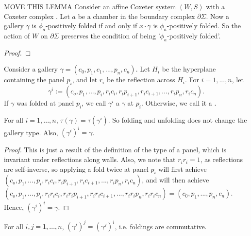 \documentclass[11pt]{article}
\begin{document}
\begin{lemma} MOVE THIS LEMMA
    Consider an affine Coxeter system $(W,S)$ with a Coxeter complex \sg. Let $a$ be a chamber in the boundary complex $\partial\Sigma$. Now a gallery $\gamma$ is $\phi_a$-positively folded if and only if $x\cdot \gamma$ is $\phi_a$-positively folded. So the action of $W$ on $\partial\Sigma$ preserves the condition of being '$\phi_a$-positively folded'.
\end{lemma}

\begin{proof}
    
\end{proof}

\begin{definition}
    Consider a gallery $\gamma = (c_0,p_1,c_1,...,p_n,c_n)$. Let $H_i$ be the hyperplane containing the panel $p_i$, and let $r_i$ be the reflection across $H_i$. For $i=1,...,n$, let
    \[\gamma^i:=(c_o,p_1,...,p_i,r_ic_i,r_ip_{i+1},r_ic_{i+1},...,r_ip_n,r_ic_n).\]
    If $\gamma$ was folded at panel $p_i$, we call $\gamma^i$ a $\gamma$ at $p_i$. Otherwise, we call it a .
\end{definition}

\begin{lemma}
    For all $i=1,...,n$, $\tau(\gamma)=\tau(\gamma^i)$. So folding and unfolding does not change the gallery type. Also, $(\gamma^i)^i=\gamma$.
\end{lemma}

\begin{proof}
    This is just a result of the definition of the type of a panel, which is invariant under reflections along walls. Also, we note that $r_ir_i=1$, as reflections are self-inverse, so applying a fold twice at panel $p_i$ will first achieve $(c_o,p_1,...,p_i,r_ic_i,r_ip_{i+1},r_ic_{i+1},...,r_ip_n,r_ic_n)$, and will then achieve $(c_o,p_1,...,p_i,r_ir_ic_i,r_ir_ip_{i+1},r_ir_ic_{i+1},...,r_ir_ip_n,r_ir_ic_n)=(c_0,p_1,...,p_n,c_n)$. Hence, $(\gamma^i)^i=\gamma$.
\end{proof}

\begin{lemma}
    For all $i,j=1,...,n$, $(\gamma^i)^j=(\gamma^j)^i$, i.e. foldings are commutative.
\end{lemma}
\end{document}
